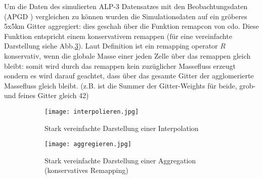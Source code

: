 Um die Daten des simulierten ALP-3 Datensatzes mit den Beobachtungsdaten (APGD \cite{meteoswiss}) vergleichen zu können wurden die Simulationsdaten auf ein gröberes 5x5km Gitter aggregiert: dies geschah über die Funktion remapcon von cdo. Diese Funktion entspricht einem konservativem remappen (für eine vereinfachte Darstellung siehe Abb.\ref{fig:aggregieren}). Laut Definition \cite{remapcon} ist ein remapping operator $R$ konservativ, wenn die globale Masse einer jeden Zelle über das remappen gleich bleibt: somit wird durch das remappen kein zuzüglicher Massefluss erzeugt sondern es wird darauf geachtet, dass über das gesamte Gitter der agglomerierte Massefluss gleich bleibt. (z.B. ist die Summer der Gitter-Weights für beide, grob- und feines Gitter gleich 42)
\begin{figure}[h]
	\begin{subfigure}{0.49\textwidth}
		\texttt{[image: interpolieren.jpg]}
		\caption{Stark vereinfachte Darstellung einer Interpolation}
		\label{fig:interpolieren}
	\end{subfigure}
	\begin{subfigure}{0.49\textwidth}
		\texttt{[image: aggregieren.jpg]}
		\caption{Stark vereinfachte Darstellung einer Aggregation (konservatives Remapping)}
		\label{fig:aggregieren}
	\end{subfigure}
	\caption{}
\end{figure}